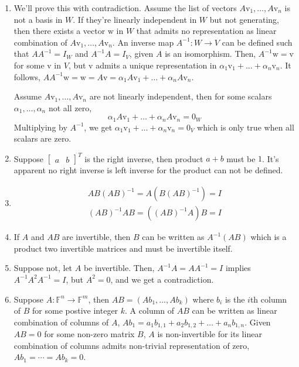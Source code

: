 \documentclass{article}
\newcommand{\F}{\mathbb{F}}
\newcommand{\vv}{\mathrm{v}}
\newcommand{\ww}{\mathrm{w}}
\newcommand{\zero}{\mathrm{0}}
\begin{document}
\begin{enumerate}[label=\textbf{6.\arabic*.}]
    \item We'll prove this with contradiction. Assume the list of vectors
    $A\vv_1, \ldots, A\vv_n$ is not a basis in $W$.
    If they're linearly independent in $W$ but not generating, then there exists
    a vector $\ww$ in $W$ that admits no representation as linear combination of
    $A\vv_1, \ldots, A\vv_n$. An inverse map $A^{-1}: W \rightarrow V$ can be
    defined such that $AA^{-1} = I_{W}$ and $A^{-1}A = I_{V}$, given $A$ is an
    isomorphism. Then, $A^{-1}\ww = \vv$ for some $\vv$ in $V$, but $\vv$ admits
    a unique representation in $\alpha_1\vv_1 + \ldots + \alpha_n\vv_n$. It
    follows, $AA^{-1}\ww = \ww = A\vv = \alpha_1A\vv_1 + \ldots +
    \alpha_nA\vv_n$.

    Assume $A\vv_1, \ldots, A\vv_n$ are not linearly independent, then
    for some scalars $\alpha_1, \ldots, \alpha_n$ not all zero,
    $$\alpha_1A\vv_1 + \ldots + \alpha_nA\vv_n = \zero_W$$
    Multiplying by $A^{-1}$, we get $\alpha_1\vv_1 + \ldots + \alpha_n\vv_n =
    \zero_V$ which is only true when all scalars are zero.
    
    \item Suppose $\left[\begin{matrix}a & b\end{matrix}\right]^T$ is the right
    inverse, then product $a+b$ must be $1$. It's apparent no right
    inverse is left inverse for the product can not be defined.

    \addtocounter{enumi}{3}
    
    \item \begin{align*} AB(AB)^{-1} = A(B(AB)^{-1}) = I\\
    (AB)^{-1}AB = ((AB)^{-1}A)B = I
    \end{align*}

    \item If $A$ and $AB$ are invertible, then $B$ can be written as
    $A^{-1}(AB)$ which is a product two invertible matrices and must be
    invertible itself.

    \item Suppose not, let $A$ be invertible. Then, $A^{-1}A = AA^{-1} = I$
    implies $A^{-1}A^2A^{-1} = I$, but $A^2 = 0$, and we get a contradiction.
    
    \item Suppose $A:\F^n \to \F^m$, then $AB = (Ab_1, \ldots, Ab_k)$ where $b_i$
    is the $i$th column of $B$ for some postive integer $k$. A column of $AB$
    can be written as linear combination of columns of $A$,
    $Ab_1 = a_1b_{1, 1} + a_2b_{1, 2} + \ldots + a_nb_{1, n}$.
    Given $AB=0$ for some non-zero matrix $B$, $A$ is non-invertible for its 
    linear combination of columns admits non-trivial representation of zero,
    $Ab_1 = \cdots = Ab_k = 0$.


\end{enumerate}
\end{document}
